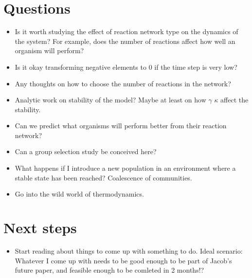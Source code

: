 \documentclass[10pt,letterpaper]{article}
\begin{document}
    \section*{Questions}
	\begin{itemize}
	    \item Is it worth studying the effect of reaction network type on the dynamics of the system? For example, does the number of reactions affect how well an organism will perform? 
	    \item Is it okay transforming negative elements to 0 if the time step is very low?
	    \item Any thoughts on how to choose the number of reactions in the network?
	 	\item Analytic work on stability of the model? Maybe at least on how $ \gamma $ $ \kappa $ affect the stability.
	 	\item Can we predict what organisms will  perform better from their reaction network?
	 	\item Can a group selection study be conceived here?
	 	\item What happens if I introduce a new population in an environment where a stable state has been reached? Coalescence of communities.
	 	\item Go into the wild world of thermodynamics.
	\end{itemize}

	


	\section*{Next steps}
		\begin{itemize}
			\item Start reading about things to come up with something to do. Ideal scenario: Whatever I come up with needs to be good enough to be part of Jacob's future paper, and feasible enough to be comleted in 2 months!?
		\end{itemize}
	
		
		
\end{document}
